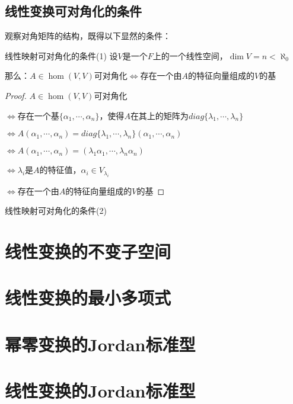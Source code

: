 \documentclass[12pt, a4paper, oneside, UTF8]{ctexbook}
\begin{document}
		\subsection{线性变换可对角化的条件}
			观察对角矩阵的结构，既得以下显然的条件：
			\begin{them}{线性映射可对角化的条件(1)}{}
				设$V$是一个$F$上的一个线性空间，$\dim V = n < \aleph_0$

				那么：$A \in \hom(V,V)$可对角化$\Leftrightarrow$存在一个由$A$的特征向量组成的$V$的基
			\end{them}
			\begin{proof}
				$A \in \hom(V,V)$可对角化

				$\Leftrightarrow$存在一个基$\{\alpha_1,\cdots,\alpha_n\}$，使得$A$在其上的矩阵为$diag\{\lambda_1,\cdots,\lambda_n\}$

				$\Leftrightarrow A(\alpha_1,\cdots,\alpha_n)=diag\{\lambda_1,\cdots,\lambda_n\}(\alpha_1,\cdots,\alpha_n)$

				$\Leftrightarrow A(\alpha_1,\cdots,\alpha_n)=(\lambda_1\alpha_1,\cdots,\lambda_n \alpha_n)$

				$\Leftrightarrow \lambda_i$是$A$的特征值，$\alpha_i \in V_{\lambda_i}$

				$\Leftrightarrow $存在一个由$A$的特征向量组成的$V$的基
			\end{proof}
			\begin{corollary}{线性映射可对角化的条件(2)}{}
				
			\end{corollary}
	\section{线性变换的不变子空间}
	\section{线性变换的最小多项式}
	\section{幂零变换的Jordan标准型}
	\section{线性变换的Jordan标准型}
\ifx\allfiles\undefined
\end{document}
